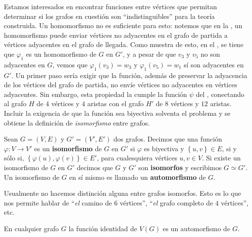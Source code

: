Estamos interesados en encontrar funciones entre vértices que permitan determinar si los grafos en cuestión son ``indistinguibles'' para la teoría construida. Un homomorfismo no es suficiente para esto: notemos que en la , un homomorfismo puede enviar vértices no adyacentes en el grafo de partida a vértices adyacentes en el grafo de llegada. Como muestra de esto, en el , se tiene que $\varphi_1$ es un homomorfismo de $G$ en $G'$, y a pesar de que $v_3$ y $v_5$ no son adyacentes en $G$, vemos que $\varphi_1(v_3)=w_3$ y $\varphi_1(v_5)=w_1$ sí son adyacentes en $G'$. Un primer paso sería exigir que la función, además de preservar la adyacencia de los vértices del grafo de partida, no envíe vértices no adyacentes en vértices adyacentes. Sin embargo, esta propiedad la cumple la función $\psi$ del , conectando al grafo $H$ de $4$ vértices y $4$ aristas con el grafo $H'$ de $8$ vértices y $12$ aristas. Incluir la exigencia de que la función sea biyectiva solventa el problema y se obtiene la definición de \textit{isomorfismo} entre grafos.
\begin{Def}
   Sean $G=(V,E)$ y $G'=(V',E')$ dos grafos. Decimos que una función $\varphi:V\to V'$ es un \textbf{isomorfismo} de $G$ en $G'$ si $\varphi$ es biyectiva y $\left\lbrace u,v\right\rbrace\in E$, si y sólo si, $\left\lbrace \varphi(u), \varphi(v)\right\rbrace\in E'$, para cualesquiera vértices $u,v\in V$. Si existe un isomorfismo de $G$ en $G'$ decimos que $G$ y $G'$ son \textbf{isomorfos} y escribimos $G\simeq G'$. Un isomorfismo de $G$ en sí mismo es llamado un \textbf{automorfismo} de $G$.
\end{Def}
Usualmente no hacemos distinción alguna entre grafos isomorfos. Esto es lo que nos permite hablar de ``\textit{el} camino de $6$ vértices'', ``\textit{el} grafo completo de $4$ vértices'', etc.
\begin{Obs}
   En cualquier grafo $G$ la función identidad de $V(G)$ es un automorfismo de $G$.
\end{Obs}
